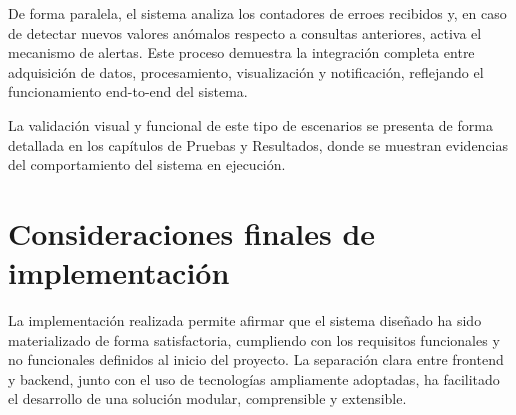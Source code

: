 De forma paralela, el sistema analiza los contadores de erroes recibidos y, en caso de detectar nuevos valores anómalos respecto a consultas anteriores, activa el mecanismo de alertas. Este proceso demuestra la integración completa entre adquisición de datos, procesamiento, visualización y notificación, reflejando el funcionamiento end-to-end del sistema.

La validación visual y funcional de este tipo de escenarios se presenta de forma detallada en los capítulos de Pruebas y Resultados, donde se muestran evidencias del comportamiento del sistema en ejecución.

\section{Consideraciones finales de implementación}

La implementación realizada permite afirmar que el sistema diseñado ha sido materializado de forma satisfactoria, cumpliendo con los requisitos funcionales y no funcionales definidos al inicio del proyecto. La separación clara entre frontend y backend, junto con el uso de tecnologías ampliamente adoptadas, ha facilitado el desarrollo de una solución modular, comprensible y extensible.